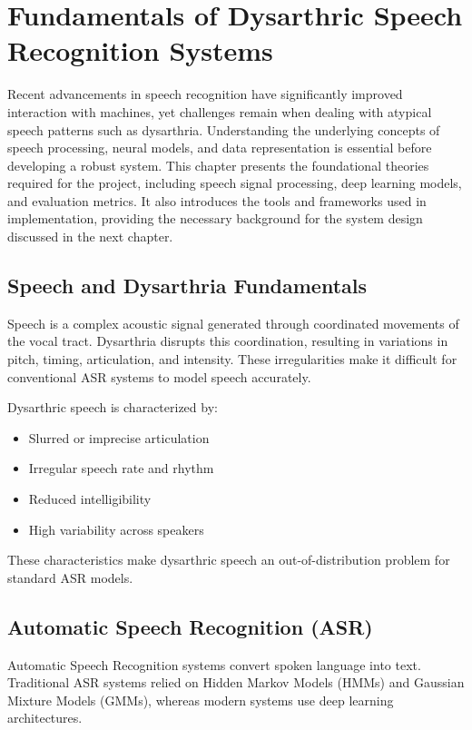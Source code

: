 \chapter{Fundamentals of Dysarthric Speech Recognition Systems}

Recent advancements in speech recognition have significantly improved interaction with machines, yet challenges remain when dealing with atypical speech patterns such as dysarthria. Understanding the underlying concepts of speech processing, neural models, and data representation is essential before developing a robust system. This chapter presents the foundational theories required for the project, including speech signal processing, deep learning models, and evaluation metrics. It also introduces the tools and frameworks used in implementation, providing the necessary background for the system design discussed in the next chapter.

\section{Speech and Dysarthria Fundamentals}

Speech is a complex acoustic signal generated through coordinated movements of the vocal tract. Dysarthria disrupts this coordination, resulting in variations in pitch, timing, articulation, and intensity. These irregularities make it difficult for conventional ASR systems to model speech accurately.

Dysarthric speech is characterized by:
\begin{itemize}
\item Slurred or imprecise articulation
\item Irregular speech rate and rhythm
\item Reduced intelligibility
\item High variability across speakers
\end{itemize}

These characteristics make dysarthric speech an out-of-distribution problem for standard ASR models.

\section{Automatic Speech Recognition (ASR)}

Automatic Speech Recognition systems convert spoken language into text. Traditional ASR systems relied on Hidden Markov Models (HMMs) and Gaussian Mixture Models (GMMs), whereas modern systems use deep learning architectures.

